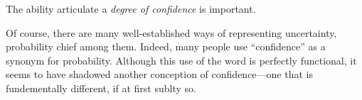 \def\stmt{$A$}


The ability articulate
a \emph{degree of confidence}
is important.

Of course, there are many well-established ways of representing uncertainty,
	probability chief among them.
Indeed, many people use ``confidence'' as a synonym for probability.
Although this use of the word is perfectly functional, it seems to have shadowed another conception of confidence---one that is fundementally different, if at first sublty so.






